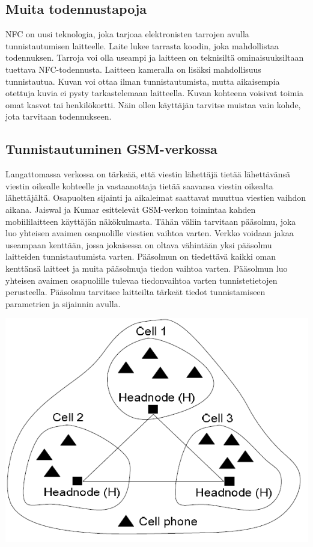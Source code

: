 \documentclass[finnish]{tktltiki2}
\theoremstyle{definition}
\theoremstyle{remark}
\begin{document}
\subsection{Muita todennustapoja}

NFC on uusi teknologia, joka tarjoaa elektronisten tarrojen avulla tunnistautumisen laitteelle. Laite lukee tarrasta koodin, joka mahdollistaa todennuksen. Tarroja voi olla useampi ja laitteen on teknisiltä ominaisuuksiltaan tuettava NFC-todennusta. Laitteen kameralla on lisäksi mahdollisuus tunnistautua. Kuvan voi ottaa ilman tunnistautumista, mutta aikaisempia otettuja kuvia ei pysty tarkastelemaan laitteella. Kuvan kohteena voisivat toimia omat kasvot tai henkilökortti. Näin ollen käyttäjän tarvitse muistaa vain kohde, jota tarvitaan todennukseen.

\subsection{Tunnistautuminen GSM-verkossa}

Langattomassa verkossa on tärkeää, että viestin lähettäjä tietää lähettävänsä viestin oikealle kohteelle ja vastaanottaja tietää saavansa viestin oikealta lähettäjältä. Osapuolten sijainti ja aikaleimat saattavat muuttua viestien vaihdon aikana. Jaiswal ja Kumar \cite{cell} esittelevät GSM-verkon toimintaa kahden mobiililaitteen käyttäjän näkökulmasta. Tähän väliin tarvitaan pääsolmu, joka luo yhteisen avaimen osapuolille viestien vaihtoa varten. Verkko voidaan jakaa useampaan kenttään, jossa jokaisessa on oltava vähintään yksi pääsolmu laitteiden tunnistautumista varten. Pääsolmun on tiedettävä kaikki oman kenttänsä laitteet ja muita pääsolmuja tiedon vaihtoa varten. Pääsolmun luo yhteisen avaimen osapuolille tulevaa tiedonvaihtoa varten tunnistetietojen perusteella. Pääsolmu tarvitsee laitteilta tärkeät tiedot tunnistamiseen parametrien ja sijainnin avulla.

\includegraphics[scale=0.6]{nodes}
\end{document}

